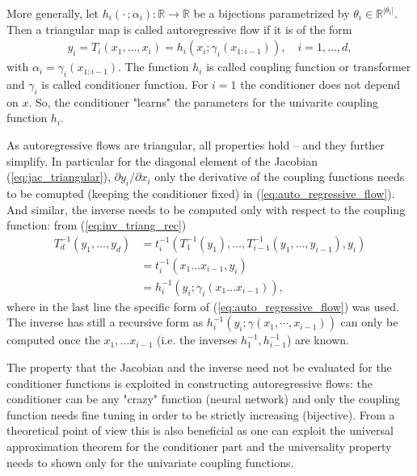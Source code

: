 \documentclass[12pt,a4paper]{article}
\begin{document}
More generally, let $h_i(\cdot\,; \alpha_i): \mathbb{R} \rightarrow \mathbb{R}$ be a bijections parametrized by $\theta_i \in \mathbb{R}^{|\theta_{i}|}$. Then a triangular map is called autoregressive flow if it is of the form 
\begin{align} \label{eq:auto_regressive_flow}
	y_i =T_i(x_1,\dots, x_i) = h_i(x_i; \gamma_i(x_{1:i-1})), \quad i=1,\dots,d, 
\end{align} 
with  $\alpha_i = \gamma_i(x_{1:i-1})$. The function $h_i$ is called coupling function or transformer and  $\gamma_i$ is called conditioner function. For $i=1$ the conditioner does not depend on $x$.  So, the conditioner "learns" the parameters for the univarite coupling function $h_i$. 

As autoregressive flows are triangular, all properties hold -- and they further simplify. In particular for the diagonal element of the Jacobian (\ref{eq:jac_triangular}), $\partial y_i / \partial x_i$ only the derivative of the coupling functions needs to be comupted (keeping the conditioner fixed) in (\ref{eq:auto_regressive_flow}). And similar, the inverse needs to be computed only with respect to the coupling function: from (\ref{eq:inv_triang_rec})
\begin{align} \label{eq:auto_regressive_flow_inv}
	T_d^{-1}(y_1,\dots, y_d) 
	&= t_i^{-1}(T_1^{-1}(y_1), \dots, T_{i-1}^{-1}(y_1, \dots,y_{i-1} ), y_i) \nonumber \\ 
	&=t_i^{-1}(x_1\dots x_{i-1}, y_i) \nonumber \\
	&=h_i^{-1}(y_i; \gamma_i(x_1\dots x_{i-1})),
\end{align}
where in the last line the specific form of (\ref{eq:auto_regressive_flow}) was used. The inverse has still a recursive form as $h_i^{-1}(y_i; \gamma(x_1, \cdots, x_{i-1}))$ can only be computed once the $x_1, \dots x_{i-1}$ (i.e. the inverses  $h_1^{-1}, h_{i-1}^{-1}$) are known. 

The property that the Jacobian and the inverse need not be evaluated for the conditioner functions is exploited in constructing autoregressive flows: the conditioner can be any "crazy" function (neural network) and only the coupling function needs fine tuning in order to be strictly increasing (bijective). From a theoretical point of view this is also beneficial as one can exploit the universal approximation theorem for the conditioner part and the universality property needs to shown only for the univariate coupling functions. \cite{jaini_polynomial_flow_2019, wehenkel_unconstraint_monotonic_neural_networks, huang_2018_neural_autoregressive_flows}
\end{document}
